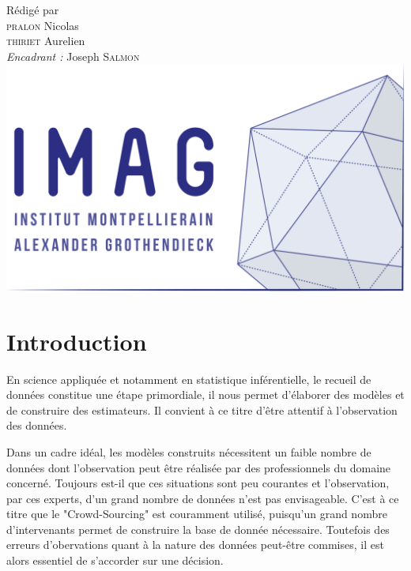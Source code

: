\documentclass[frenchb]{report}
\newcommand{\1}{\mathbbm{1}}
\theoremstyle{definition}\newtheorem{defn}{Définition}
\theoremstyle{definition}\newtheorem{exm}{Exemple}
\theoremstyle{definition}\newtheorem{nota}{Notation}
\theoremstyle{definition}\newtheorem{rem}{Remarque}
\begin{document}
\begin{titlepage}
\begin{center}
{\large Rédigé par\\}
{\Large \textsc{pralon} Nicolas}\\
{\Large \textsc{thiriet} Aurelien}\\
{\large \emph{Encadrant :} Joseph \textsc{Salmon}}\\[1.5cm] 

\includegraphics[scale=0.7]{imag_logo.png}

\end{center}
\end{titlepage}
\tableofcontents
\newpage

\chapter*{Introduction}

En science appliquée et notamment en statistique inférentielle, le recueil de données constitue une étape primordiale, il nous permet d'élaborer des modèles et de construire des estimateurs. Il convient à ce titre d'être attentif à l'observation des données.

Dans un cadre idéal, les modèles construits nécessitent un faible nombre de données dont l'observation peut être réalisée par des professionnels du domaine concerné. Toujours est-il que ces situations sont peu courantes et l'observation, par ces experts, d'un grand nombre de données n'est pas envisageable. C'est à ce titre que le "Crowd-Sourcing" est couramment utilisé, puisqu'un grand nombre d'intervenants permet de construire la base de donnée nécessaire. Toutefois des erreurs d'obervations quant à la nature des données peut-être commises, il est alors essentiel de s'accorder sur une décision.
\end{document}
